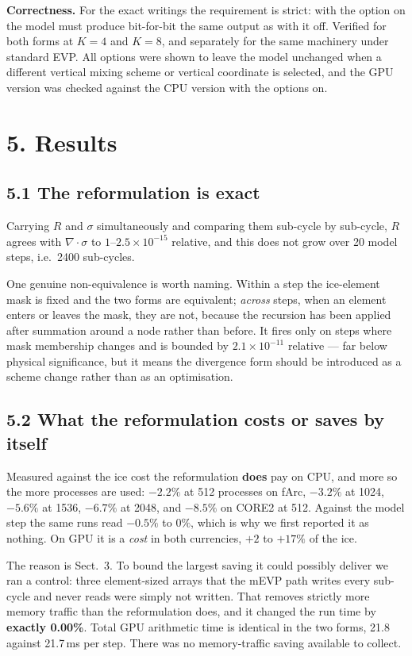 \documentclass[11pt,a4paper]{article}
\begin{document}
\textbf{Correctness.} For the exact writings the requirement is strict: with the option on the
model must produce bit-for-bit the same output as with it off. Verified for both forms at $K=4$ and
$K=8$, and separately for the same machinery under standard EVP. All options were shown to leave
the model unchanged when a different vertical mixing scheme or vertical coordinate is selected, and
the GPU version was checked against the CPU version with the options on.

\section*{5. Results}

\subsection*{5.1 The reformulation is exact}

Carrying $R$ and $\sigma$ simultaneously and comparing them sub-cycle by sub-cycle, $R$ agrees with
$\nabla\!\cdot\!\sigma$ to $1$--$2.5\times10^{-15}$ relative, and this does not grow over 20 model
steps, i.e.\ 2400 sub-cycles.

One genuine non-equivalence is worth naming. Within a step the ice-element mask is fixed and the
two forms are equivalent; \emph{across} steps, when an element enters or leaves the mask, they are
not, because the recursion has been applied after summation around a node rather than before. It
fires only on steps where mask membership changes and is bounded by $2.1\times10^{-11}$ relative
--- far below physical significance, but it means the divergence form should be introduced as a
scheme change rather than as an optimisation.

\subsection*{5.2 What the reformulation costs or saves by itself}

Measured against the ice cost the reformulation \textbf{does} pay on CPU, and more so the more
processes are used: $-2.2\%$ at 512 processes on fArc, $-3.2\%$ at 1024, $-5.6\%$ at 1536,
$-6.7\%$ at 2048, and $-8.5\%$ on CORE2 at 512. Against the model step the same runs read $-0.5\%$
to $0\%$, which is why we first reported it as nothing. On GPU it is a \emph{cost} in both
currencies, $+2$ to $+17\%$ of the ice.

The reason is Sect.~3. To bound the largest saving it could possibly deliver we ran a control:
three element-sized arrays that the mEVP path writes every sub-cycle and never reads were simply
not written. That removes strictly more memory traffic than the reformulation does, and it changed
the run time by \textbf{exactly 0.00\%}. Total GPU arithmetic time is identical in the two forms,
21.8 against 21.7\,ms per step. There was no memory-traffic saving available to collect.
\end{document}
